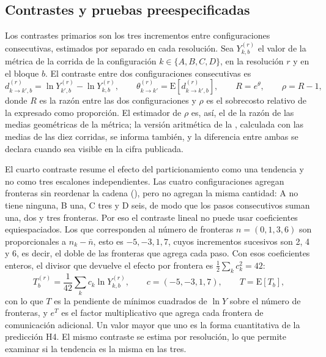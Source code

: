 \subsection{Contrastes y pruebas preespecificadas}
\label{sec:analysis-contrasts}

Los contrastes primarios son los tres incrementos entre configuraciones
consecutivas, estimados por separado en cada resolución. Sea $Y^{(r)}_{k,b}$ el
valor de la métrica de la corrida de la configuración $k\in\{A,B,C,D\}$, en la
resolución $r$ y en el bloque $b$. El contraste entre dos configuraciones
consecutivas es
\begin{equation}
  d^{(r)}_{k\to k',b} = \ln Y^{(r)}_{k',b} - \ln Y^{(r)}_{k,b},
  \qquad \theta^{(r)}_{k\to k'} = \mathrm{E}\left[d^{(r)}_{k\to k',b}\right],
  \qquad R = e^{\theta}, \qquad \rho = R - 1,
  \label{eq:contrast}
\end{equation}
donde $R$ es la razón entre las dos configuraciones y $\rho$ es el sobrecosto
relativo de la  expresado como proporción. El estimador de
$\rho$ es, así, el de la razón de las medias geométricas de la métrica; la
versión aritmética de la , calculada con las medias de las
diez corridas, se informa también, y la diferencia entre ambas se declara
cuando sea visible en la cifra publicada.

El cuarto contraste resume el efecto del particionamiento como una tendencia y
no como tres escalones independientes. Las cuatro configuraciones agregan
fronteras sin reordenar la cadena (), pero no
agregan la misma cantidad: A no tiene ninguna, B una, C tres y D seis, de modo
que los pasos consecutivos suman una, dos y tres fronteras. Por eso el
contraste lineal no puede usar coeficientes equiespaciados. Los que
corresponden al número de fronteras $n=(0,1,3,6)$ son proporcionales a
$n_k-\bar n$, esto es $-5,-3,1,7$, cuyos incrementos sucesivos son 2, 4 y 6,
es decir, el doble de las fronteras que agrega cada paso. Con esos
coeficientes enteros, el divisor que devuelve el efecto por frontera es
$\tfrac{1}{2}\sum_k c_k^2 = 42$:
\begin{equation}
  T^{(r)}_{b} = \frac{1}{42}\sum_{k} c_k \ln Y^{(r)}_{k,b},
  \qquad c = (-5,-3,1,7),
  \qquad T = \mathrm{E}\left[T_b\right],
  \label{eq:trend}
\end{equation}
con lo que $T$ es la pendiente de mínimos cuadrados de $\ln Y$ sobre el
número de fronteras, y $e^{T}$ es el factor multiplicativo que agrega cada
frontera de comunicación adicional. Un valor mayor que uno es la forma
cuantitativa de la predicción H4. El mismo contraste se estima por resolución,
lo que permite examinar si la tendencia es la misma en las tres.

